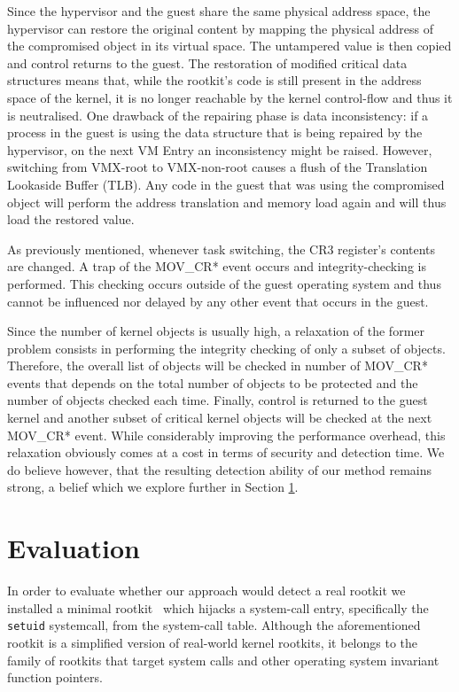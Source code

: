 Since the hypervisor and the guest share the same physical address space, the hypervisor can restore the original content by mapping the physical address of the compromised object in its virtual space. The untampered value is then copied and control returns to the guest. The restoration of modified critical data structures means that, while the rootkit's code is still present in the address space of the kernel, it is no longer reachable by the kernel control-flow and thus it is neutralised. 
One drawback of the repairing phase is data inconsistency: if a process in the guest is using the data structure that is being repaired by the hypervisor, on the next VM Entry an inconsistency might be raised. However, switching from VMX-root to VMX-non-root causes a flush of the Translation Lookaside Buffer (TLB). Any code in the guest that was using the compromised object will perform the address translation and memory load again and will thus load the restored value.

As previously mentioned, whenever task switching, the CR3 register's contents are changed. A trap of the MOV\_CR* event occurs and integrity-checking is performed. This checking occurs outside of the guest operating system and thus cannot be influenced nor delayed by any other event that occurs in the guest.

Since the number of kernel objects is usually high, a relaxation of the former problem consists in performing the integrity checking of only a subset of objects. 
Therefore, the overall list of objects will be checked in number of MOV\_CR* events that depends on the total number of objects to be protected and the number of objects checked each time. 
Finally, control is returned to the guest kernel and another subset of critical kernel objects will be checked at the next MOV\_CR* event. While considerably improving the performance overhead, this relaxation obviously comes at a cost in terms of security and detection time. We do believe however, that the resulting detection ability of our method remains strong, a belief which we explore further in Section \ref{hr:evaluation}.


\section{Evaluation}\label{hr:evaluation}

In order to evaluate whether our approach would detect a real rootkit we installed a minimal rootkit~\cite{kernel_hijack} which hijacks a system-call entry, specifically the \texttt{setuid} systemcall, from the system-call table. Although the aforementioned rootkit is a simplified version of real-world kernel rootkits, it belongs to the family of rootkits that target system calls and other operating system invariant function pointers. 

